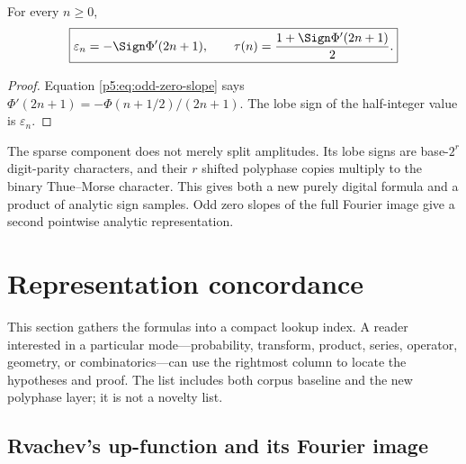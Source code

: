 \documentclass[11pt]{article}
\theoremstyle{definition}
\theoremstyle{remark}
\newcommand{\eps}{\varepsilon}
\begin{document}
\begin{corollary}
\label{p5:cor:TM-zero-slopes}
For every $n\ge0$,
\begin{equation}
 \boxed{\displaystyle
 \eps_n=-\Sign\Phi'(2n+1),
 \qquad
 \tau(n)=\frac{1+\Sign\Phi'(2n+1)}2.}                      \label{p5:eq:TM-zero-slope-sign}
\end{equation}
\end{corollary}

\begin{proof}
Equation \eqref{p5:eq:odd-zero-slope} says
$\Phi'(2n+1)=-\Phi(n+1/2)/(2n+1)$.  The lobe sign of the half-integer value is
$\eps_n$.
\end{proof}

\begin{resultboxPartiv}
The sparse component does not merely split amplitudes.  Its lobe signs are
base-$2^r$ digit-parity characters, and their $r$ shifted polyphase copies
multiply to the binary Thue--Morse character.  This gives both a new purely
digital formula and a product of analytic sign samples.  Odd zero slopes of the
full Fourier image give a second pointwise analytic representation.
\end{resultboxPartiv}

\section{Representation concordance}
\label{p5:sec:concordance}

This section gathers the formulas into a compact lookup index.  A reader
interested in a particular mode---probability, transform, product, series,
operator, geometry, or combinatorics---can use the rightmost column to locate
the hypotheses and proof.  The list includes both corpus baseline and the new
polyphase layer; it is not a novelty list.

\subsection{Rvachev's up-function and its Fourier image}
\end{document}
